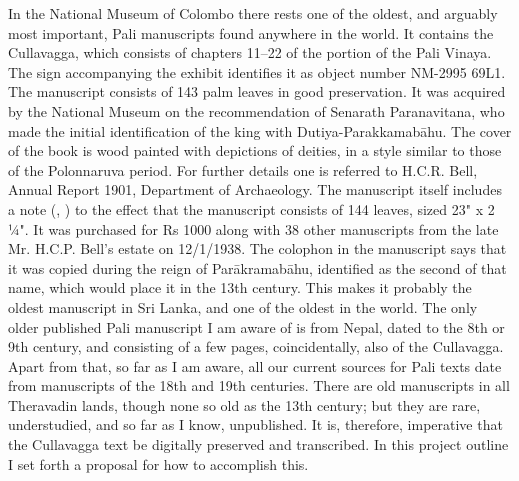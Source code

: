\markdownRendererInterblockSeparator
{}In the National Museum of Colombo there rests one of the oldest, and arguably most important, Pali manuscripts found anywhere in the world. It contains the Culla­vagga, which consists of chapters 11–22 of the  portion of the Pali Vinaya.\markdownRendererInterblockSeparator
{}\markdownRendererInterblockSeparator
{}The sign accompanying the exhibit identifies it as object number NM-2995 69L1. The manuscript consists of 143 palm leaves in good preservation. It was acquired by the National Museum on the recommendation of Senarath Paranavitana, who made the initial identification of the king with Dutiya-Parakkamabāhu. The cover of the book is wood painted with depictions of deities, in a style similar to those of the Polonnaruva period. For further details one is referred to H.C.R. Bell, Annual Report 1901, Department of Archaeology.\markdownRendererInterblockSeparator
{}The manuscript itself includes a note (, ) to the effect that the manuscript consists of 144 leaves, sized 23" x 2 ¼". It was purchased for Rs 1000 along with 38 other manuscripts from the late Mr. H.C.P. Bell’s estate on 12/1/1938.\markdownRendererInterblockSeparator
{}The colophon in the manuscript says that it was copied during the reign of Parākramabāhu, identified as the second of that name, which would place it in the 13th century. This makes it probably the oldest manuscript in Sri Lanka, and one of the oldest in the world. The only older published Pali manuscript I am aware of is from Nepal, dated to the 8th or 9th century, and consisting of a few pages, coincidentally, also of the Culla­vagga.\markdownRendererInterblockSeparator
{}Apart from that, so far as I am aware, all our current sources for Pali texts date from manuscripts of the 18th and 19th centuries. There are old manuscripts in all Theravadin lands, though none so old as the 13th century; but they are rare, understudied, and so far as I know, unpublished.\markdownRendererInterblockSeparator
{}It is, therefore, imperative that the Culla­vagga text be digitally preserved and transcribed. In this project outline I set forth a proposal for how to accomplish this.\markdownRendererInterblockSeparator
